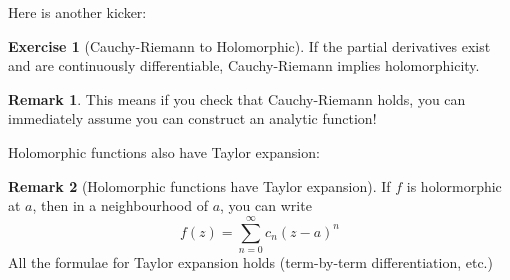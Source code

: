 \documentclass[a4paper, 12pt]{article}
\theoremstyle{definition}
\newtheorem{exercise}{Exercise}
\newtheorem{remark}{Remark}
\numberwithin{definition}{section}
\numberwithin{exercise}{section}
\numberwithin{remark}{section}
\numberwithin{figure}{section}
\begin{document}
Here is another kicker:
\begin{exercise}[Cauchy-Riemann to Holomorphic]
    If the partial derivatives exist and are continuously differentiable,
    Cauchy-Riemann implies holomorphicity.
\end{exercise}
\begin{remark}
    This means if you check that Cauchy-Riemann holds, you can immediately assume you can construct an analytic function!
\end{remark}
Holomorphic functions also have Taylor expansion:
\begin{remark}[Holomorphic functions have Taylor expansion]
    If $f$ is holormorphic at $a$, then
    in a neighbourhood of $a$, you can write
    \begin{equation*}
        f(z) = \sum_{n=0}^{\infty} c_n \left( z-a \right)^n
    \end{equation*}
    All the formulae for Taylor expansion holds (term-by-term differentiation, etc.)
\end{remark}
\end{document}
